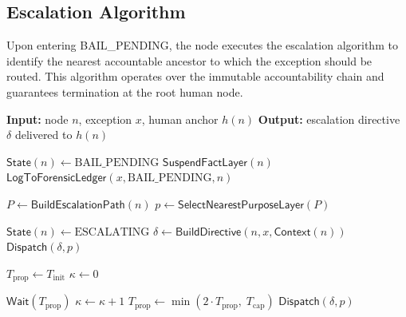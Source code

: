 \subsection{Escalation Algorithm}
\label{sec:bailout-escalation}

Upon entering BAIL\_PENDING, the node executes the escalation algorithm to identify the nearest accountable ancestor to which the exception should be routed. This algorithm operates over the immutable accountability chain and guarantees termination at the root human node.

\begin{algorithm}[htbp]
\caption{Bailout Escalation Algorithm}
\label{alg:bailout-escalation}
\begin{algorithmic}[1]
\State \textbf{Input:} node $n$, exception $x$, human anchor $h(n)$
\State \textbf{Output:} escalation directive $\delta$ delivered to $h(n)$

\State $\mathsf{State}(n) \leftarrow \text{BAIL\_PENDING}$
\State $\mathsf{SuspendFactLayer}(n)$ 
\State $\mathsf{LogToForensicLedger}(x, \text{BAIL\_PENDING}, n)$

\State $P \leftarrow \mathsf{BuildEscalationPath}(n)$ 
\State $p \leftarrow \mathsf{SelectNearestPurposeLayer}(P)$

\State $\mathsf{State}(n) \leftarrow \text{ESCALATING}$
\State $\delta \leftarrow \mathsf{BuildDirective}(n, x, \mathsf{Context}(n))$
\State $\mathsf{Dispatch}(\delta, p)$

\State $T_{\text{prop}} \leftarrow T_{\text{init}}$
\State $\kappa \leftarrow 0$

    \State $\mathsf{Wait}(T_{\text{prop}})$
        \State $\kappa \leftarrow \kappa + 1$
        \State $T_{\text{prop}} \leftarrow \min(2 \cdot T_{\text{prop}},\; T_{\text{cap}})$
        \State $\mathsf{Dispatch}(\delta, p)$ 
    \EndIf
\EndWhile


\end{algorithmic}
\end{algorithm}
